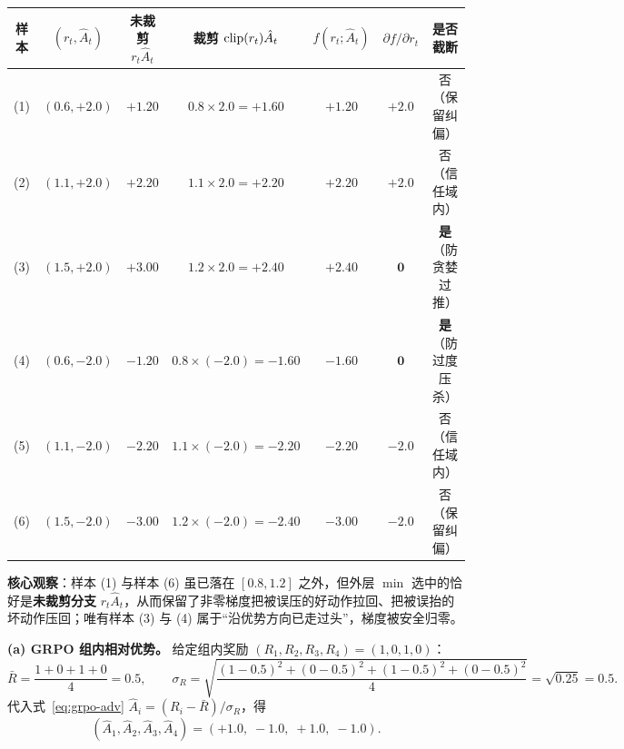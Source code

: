 \begin{center}
\footnotesize
\setlength{\tabcolsep}{4.5pt}
\begin{tabular}{@{}ccccccc@{}}
\toprule
样本 & $(r_t, \hat{A}_t)$ & 未裁剪 $r_t \hat{A}_t$ & 裁剪 $\operatorname{clip}(r_t)\hat{A}_t$ & $f(r_t; \hat{A}_t)$ & $\partial f / \partial r_t$ & 是否截断 \\
\midrule
(1) & $(0.6, +2.0)$ & $+1.20$ & $0.8 \times 2.0 = +1.60$ & $\mathbf{+1.20}$ & $+2.0$ & 否（保留纠偏） \\
(2) & $(1.1, +2.0)$ & $+2.20$ & $1.1 \times 2.0 = +2.20$ & $\mathbf{+2.20}$ & $+2.0$ & 否（信任域内） \\
(3) & $(1.5, +2.0)$ & $+3.00$ & $1.2 \times 2.0 = +2.40$ & $\mathbf{+2.40}$ & $\mathbf{0}$ & \textbf{是}（防贪婪过推） \\
(4) & $(0.6, -2.0)$ & $-1.20$ & $0.8 \times (-2.0) = -1.60$ & $\mathbf{-1.60}$ & $\mathbf{0}$ & \textbf{是}（防过度压杀） \\
(5) & $(1.1, -2.0)$ & $-2.20$ & $1.1 \times (-2.0) = -2.20$ & $\mathbf{-2.20}$ & $-2.0$ & 否（信任域内） \\
(6) & $(1.5, -2.0)$ & $-3.00$ & $1.2 \times (-2.0) = -2.40$ & $\mathbf{-3.00}$ & $-2.0$ & 否（保留纠偏） \\
\bottomrule
\end{tabular}
\end{center}

\textbf{核心观察}：样本 (1) 与样本 (6) 虽已落在 $[0.8, 1.2]$ 之外，但外层 $\min$ 选中的恰好是\textbf{未裁剪分支} $r_t \hat{A}_t$，从而保留了非零梯度把被误压的好动作拉回、把被误抬的坏动作压回；唯有样本 (3) 与 (4) 属于“沿优势方向已走过头”，梯度被安全归零。


\textbf{(a) GRPO 组内相对优势。} 给定组内奖励 $(R_1, R_2, R_3, R_4) = (1, 0, 1, 0)$：
\[
  \bar{R} = \frac{1 + 0 + 1 + 0}{4} = \mathbf{0.5}, \qquad
  \sigma_R = \sqrt{\frac{(1-0.5)^2 + (0-0.5)^2 + (1-0.5)^2 + (0-0.5)^2}{4}} = \sqrt{0.25} = \mathbf{0.5}.
\]
代入式~\eqref{eq:grpo-adv} $\hat{A}_i = (R_i - \bar{R}) / \sigma_R$，得
\[
  (\hat{A}_1, \hat{A}_2, \hat{A}_3, \hat{A}_4) = \mathbf{(+1.0,\; -1.0,\; +1.0,\; -1.0)}.
\]

